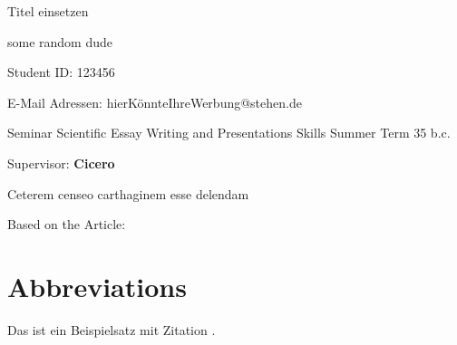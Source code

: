 \documentclass[parskip]{scrartcl}
\makeatletter
\newcommand{\workauthor}{some random dude}
\newcommand{\worktitle}{Titel einsetzen}
\newcommand{\studentid}{123456}
\newcommand{\email}{hierKönnteIhreWerbung@stehen.de}
\newcommand{\workyear}{35 b.c.}
\newcommand{\shortabstract}{Ceterem censeo carthaginem esse delendam}
\newcommand{\supervisor}{Cicero}
\makeatother
\begin{document}
\begin{titlepage}
    {
    {\vspace*{1cm}\Huge \worktitle{}}}
    
    
    
    {\Large \workauthor{}}
    
    Student ID: \studentid{}
    
    E-Mail Adressen: \email{}
    
    
    Seminar Scientific Essay Writing and Presentations Skills Summer Term \workyear{}
    
    Supervisor: \textbf{\supervisor{}}
    
    
    \shortabstract{}
    
    
    Based on the Article:\\
    
    
\end{titlepage}
\begin{abstract}
	Das ist der Abstract, leider aber ohne Inhalt: Hier könnte Ihre Werbung stehen.
\end{abstract}

\tableofcontents
{\setlength{\parskip}{0.2cm}
\section*{Abbreviations}
    \begin{acronym}[LC-MS/MS23]
        
        
        
        
    \end{acronym}
}
\tableofcontents
\newpage
Das ist ein Beispielsatz mit Zitation \citep{Alberts.2015}.







\end{document}
